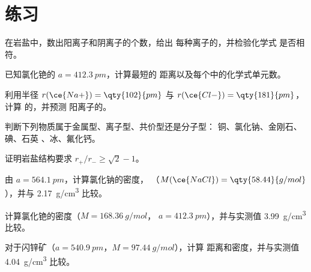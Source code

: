 \section{练习}

\begin{exercise}[$\star$]\label{exo:b1:crystals-ionic-covalent:1}
在岩盐中，数出阳离子和阴离子的个数，给出
每种离子的，并检验化学式  是否相符。
\end{exercise}

\begin{exercise}[$\star$]\label{exo:b1:crystals-ionic-covalent:2}
已知氯化铯的 $a = \qty{412.3}{pm}$，计算最短的
 距离以及每个中的化学式单元数。
\end{exercise}

\begin{exercise}[$\star$]\label{exo:b1:crystals-ionic-covalent:3}
利用半径 $r(\ce{Na+}) = \qty{102}{pm}$ 与 $r(\ce{Cl-}) =
\qty{181}{pm}$，计算  的，并预测
阳离子的。
\end{exercise}

\begin{exercise}[$\star$]\label{exo:b1:crystals-ionic-covalent:4}
判断下列物质属于金属型、离子型、共价型还是分子型：
铜、氯化钠、金刚石、碘、石英 、冰、氟化钙。
\end{exercise}

\begin{exercise}[$\star\star$]\label{exo:b1:crystals-ionic-covalent:5}
证明岩盐结构要求 $r_+/r_- \ge \sqrt2 - 1$。
\end{exercise}

\begin{exercise}[$\star\star$]\label{exo:b1:crystals-ionic-covalent:6}
由 $a = \qty{564.1}{pm}$，计算氯化钠的密度，
（$M(\ce{NaCl}) = \qty{58.44}{g/mol}$），并与
\qty{2.17}{g/cm^3} 比较。
\end{exercise}

\begin{exercise}[$\star\star$]\label{exo:b1:crystals-ionic-covalent:7}
计算氯化铯的密度（$M = \qty{168.36}{g/mol}$，
$a = \qty{412.3}{pm}$），并与实测值 \qty{3.99}{g/cm^3} 比较。
\end{exercise}

\begin{exercise}[$\star\star$]\label{exo:b1:crystals-ionic-covalent:8}
对于闪锌矿（$a = \qty{540.9}{pm}$，$M = \qty{97.44}{g/mol}$），计算
 距离和密度，并与实测值
\qty{4.04}{g/cm^3} 比较。
\end{exercise}

